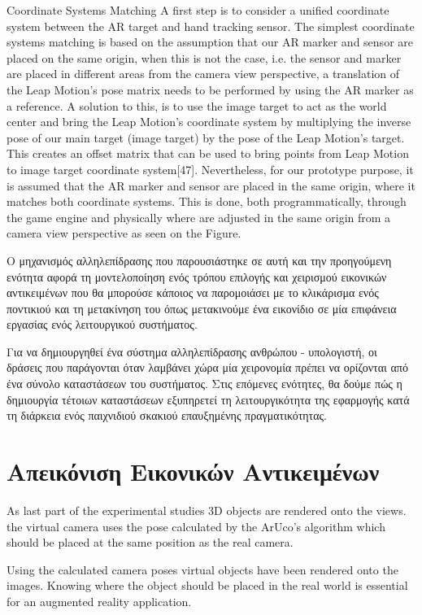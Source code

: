Coordinate Systems Matching A first step is to consider a unified coordinate system between the AR target and hand tracking sensor. The simplest coordinate systems matching is based on the assumption that our AR marker and sensor are placed on the same origin, when this is not the case, i.e. the sensor and marker are placed in different areas from the camera view perspective, a translation of the Leap Motion’s pose matrix needs to be performed by using the AR marker as a reference. A solution to this, is to use the image target to act as the world center and bring the Leap Motion’s coordinate system by multiplying the inverse pose of our main target (image target) by the pose of the Leap Motion’s target. This creates an offset matrix that can be used to bring points from Leap Motion to image target coordinate system[47]. Nevertheless, for our prototype purpose, it is assumed that the AR marker and sensor are placed in the same origin, where it matches both coordinate systems. This is done, both programmatically, through the game engine and physically where are adjusted in the same origin from a camera view perspective as seen on the Figure.

Ο μηχανισμός αλληλεπίδρασης που παρουσιάστηκε σε αυτή και την προηγούμενη ενότητα αφορά τη μοντελοποίηση ενός τρόπου επιλογής και χειρισμού εικονικών αντικειμένων που θα μπορούσε κάποιος να παρομοιάσει με το κλικάρισμα ενός ποντικιού και τη μετακίνηση του όπως μετακινούμε ένα εικονίδιο σε μία επιφάνεια εργασίας ενός λειτουργικού συστήματος.

Για να δημιουργηθεί ένα σύστημα αλληλεπίδρασης ανθρώπου - υπολογιστή, οι δράσεις που παράγονται όταν λαμβάνει χώρα μία χειρονομία πρέπει να ορίζονται από ένα σύνολο καταστάσεων του συστήματος. Στις επόμενες ενότητες, θα δούμε πώς η δημιουργία τέτοιων καταστάσεων εξυπηρετεί τη λειτουργικότητα της εφαρμογής κατά τη διάρκεια ενός παιχνιδιού σκακιού επαυξημένης πραγματικότητας.



\section{Απεικόνιση Εικονικών Αντικειμένων} \label{s:rendering}


As last part of the experimental studies 3D objects are rendered onto the views. the virtual camera uses the pose calculated by the ArUco's algorithm which should be placed at the same position as the real camera. 

Using the calculated camera poses virtual objects have been rendered onto the images. Knowing where the object should be placed in the real world is essential for an augmented reality application. 




